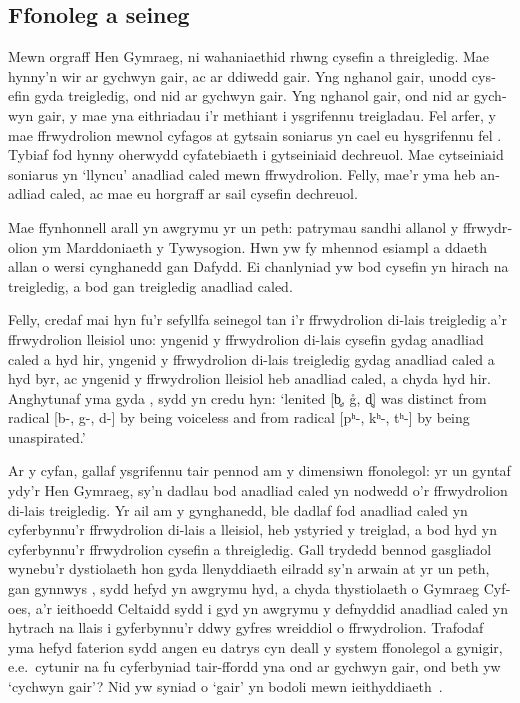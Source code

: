 \begin{welsh}
\section{Ffonoleg a seineg}
Mewn orgraff Hen Gymraeg, ni wahaniaethid rhwng cysefin a threigledig. Mae hynny’n wir ar gychwyn gair, ac ar ddiwedd gair. Yng nghanol gair, unodd  cysefin gyda  treigledig, ond nid ar gychwyn gair. Yng nghanol gair, ond nid ar gychwyn gair, y mae yna eithriadau i’r methiant i ysgrifennu treigladau. Fel arfer, y mae ffrwydrolion mewnol cyfagos at gytsain soniarus yn cael eu hysgrifennu fel . Tybiaf fod hynny oherwydd cyfatebiaeth i gytseiniaid dechreuol. Mae cytseiniaid soniarus yn ‘llyncu’ anadliad caled mewn ffrwydrolion. Felly, mae’r  yma heb anadliad caled, ac mae eu horgraff ar sail  cysefin dechreuol. 

Mae ffynhonnell arall yn awgrymu yr un peth: patrymau sandhi allanol y ffrwydrolion ym Marddoniaeth y Tywysogion. Hwn yw fy mhennod esiampl a ddaeth allan o wersi cynghanedd gan Dafydd. Ei chanlyniad yw bod  cysefin yn hirach na  treigledig, a bod gan  treigledig anadliad caled.

Felly, credaf mai hyn fu'r sefyllfa seinegol tan i’r ffrwydrolion di-lais treigledig a’r ffrwydrolion lleisiol uno: yngenid y ffrwydrolion di-lais cysefin gydag anadliad caled a hyd hir, yngenid y ffrwydrolion di-lais treigledig gydag anadliad caled a hyd byr, ac yngenid y ffrwydrolion lleisiol heb anadliad caled, a chyda hyd hir. Anghytunaf yma gyda \textcite[\S30]{koch_*cothairche_1990}, sydd yn credu hyn: ‘lenited [b̥, g̊, d̥] was distinct from radical [b-, g-, d-] by being voiceless and from radical [pʰ-, kʰ-, tʰ-] by being unaspirated.’

Ar y cyfan, gallaf ysgrifennu tair pennod am y dimensiwn ffonolegol: yr un gyntaf ydy'r Hen Gymraeg, sy'n dadlau bod anadliad caled yn nodwedd o'r ffrwydrolion di-lais treigledig. Yr ail am y gynghanedd, ble dadlaf fod anadliad caled yn cyferbynnu'r ffrwydrolion di-lais a lleisiol, heb ystyried y treiglad, a bod hyd yn cyferbynnu'r ffrwydrolion cysefin a threigledig. Gall trydedd bennod gasgliadol wynebu'r dystiolaeth hon gyda llenyddiaeth eilradd sy'n arwain at yr un peth, gan gynnwys \textcite{falchun_systeme_1951}, sydd hefyd yn awgrymu hyd, a chyda thystiolaeth o Gymraeg Cyfoes, a'r ieithoedd Celtaidd sydd i gyd yn awgrymu y defnyddid anadliad caled yn hytrach na llais i gyferbynnu'r ddwy gyfres wreiddiol o ffrwydrolion. Trafodaf yma hefyd faterion sydd angen eu datrys cyn deall y system ffonolegol a gynigir, e.e.\ cytunir na fu cyferbyniad tair-ffordd yna ond ar gychwyn gair, ond beth yw `cychwyn gair'? Nid yw syniad o `gair' yn bodoli mewn ieithyddiaeth~\autocite{haspelmath_indeterminacy_2011}. 



\end{welsh}
